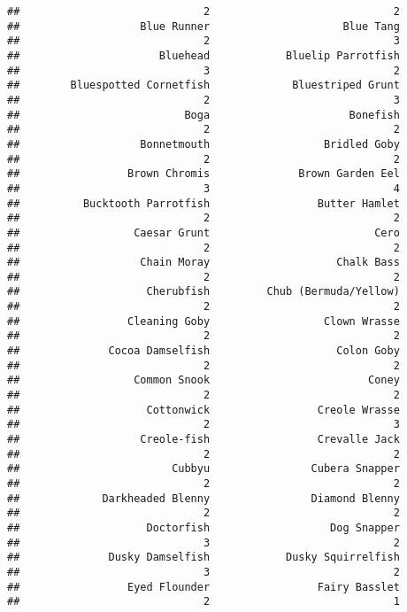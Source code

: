 \documentclass[
]{article}
\begin{document}
\begin{verbatim}
##                             2                             2 
##                   Blue Runner                     Blue Tang 
##                             2                             3 
##                      Bluehead            Bluelip Parrotfish 
##                             3                             2 
##        Bluespotted Cornetfish             Bluestriped Grunt 
##                             2                             3 
##                          Boga                      Bonefish 
##                             2                             2 
##                   Bonnetmouth                  Bridled Goby 
##                             2                             2 
##                 Brown Chromis              Brown Garden Eel 
##                             3                             4 
##          Bucktooth Parrotfish                 Butter Hamlet 
##                             2                             2 
##                  Caesar Grunt                          Cero 
##                             2                             2 
##                   Chain Moray                    Chalk Bass 
##                             2                             2 
##                    Cherubfish         Chub (Bermuda/Yellow) 
##                             2                             2 
##                 Cleaning Goby                  Clown Wrasse 
##                             2                             2 
##              Cocoa Damselfish                    Colon Goby 
##                             2                             2 
##                  Common Snook                         Coney 
##                             2                             2 
##                    Cottonwick                 Creole Wrasse 
##                             2                             3 
##                   Creole-fish                 Crevalle Jack 
##                             2                             2 
##                        Cubbyu                Cubera Snapper 
##                             2                             2 
##             Darkheaded Blenny                Diamond Blenny 
##                             2                             2 
##                    Doctorfish                   Dog Snapper 
##                             3                             2 
##              Dusky Damselfish            Dusky Squirrelfish 
##                             3                             2 
##                 Eyed Flounder                 Fairy Basslet 
##                             2                             1 

\end{verbatim}
\end{document}
